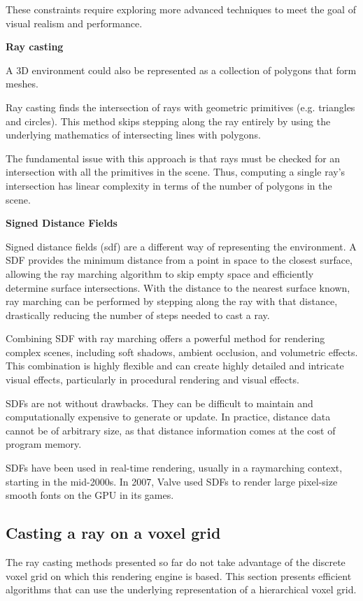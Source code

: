 These constraints require exploring more advanced techniques to meet the goal of visual realism and performance.

\textbf{Ray casting}

A 3D environment could also be represented as a collection of polygons that form meshes.

Ray casting finds the intersection of rays with geometric primitives (e.g. triangles and circles). This method skips stepping along the ray entirely by using the underlying mathematics of intersecting lines with polygons.

The fundamental issue with this approach is that rays must be checked for an intersection with all the primitives in the scene. Thus, computing a single ray's intersection has linear complexity in terms of the number of polygons in the scene.


\vspace{0.5cm}
\label{def:sdf}
\textbf{Signed Distance Fields}

Signed distance fields (\acrshort{sdf}) are a different way of representing the environment. A SDF provides the minimum distance from a point in space to the closest surface, allowing the ray marching algorithm to skip empty space and efficiently determine surface intersections.
With the distance to the nearest surface known, ray marching can be performed by stepping along the ray with that distance, drastically reducing the number of steps needed to cast a ray.

Combining SDF with ray marching offers a powerful method for rendering complex scenes, including soft shadows, ambient occlusion, and volumetric effects.
This combination is highly flexible and can create highly detailed and intricate visual effects, particularly in procedural rendering and visual effects.

SDFs are not without drawbacks. They can be difficult to maintain and computationally expensive to generate or update. In practice, distance data cannot be of arbitrary size, as that distance information comes at the cost of program memory.

SDFs have been used in real-time rendering, usually in a raymarching context, starting in the mid-2000s. In 2007, Valve used SDFs to render large pixel-size smooth fonts on the GPU in its games\supercite{valve}.

\subsection{Casting a ray on a voxel grid}
The ray casting methods presented so far do not take advantage of the discrete voxel grid on which this rendering engine is based. This section presents efficient algorithms that can use the underlying representation of a hierarchical voxel grid.

